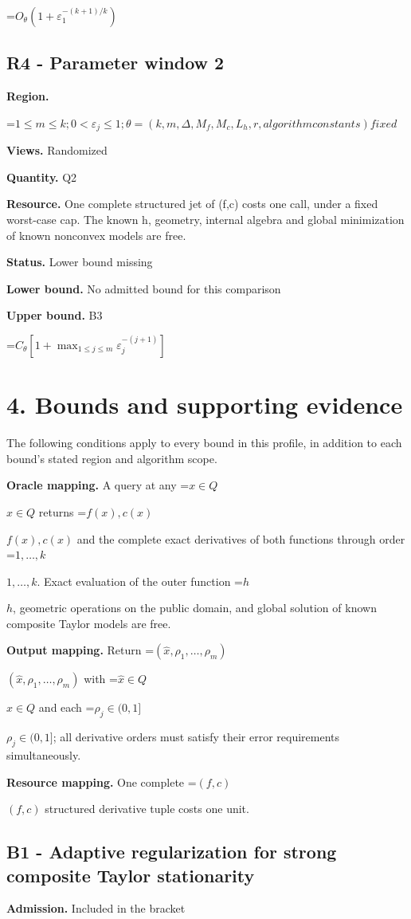 \documentclass[10pt,a4paper]{article}
\newcommand{\AtlasMath}[1]{\par\begingroup\centering\setbox0=\hbox{$\displaystyle #1$}\ifdim\wd0>1.4\linewidth\typeout{ATLAS WIDE FORMULA: \the\wd0}\fi\ifdim\wd0>\linewidth\resizebox{\linewidth}{!}{\box0}\else\box0\fi\par\endgroup}
\newcommand{\AtlasInlineMath}[1]{\begingroup\setbox0=\hbox{$#1$}\ifdim\wd0>.4\linewidth\endgroup\AtlasMath{#1}\else\endgroup$#1$\fi}
\begin{document}
\AtlasMath{O_\theta(1+\varepsilon_1^{-(k+1)/k})}
\subsection{R4 - Parameter window 2}
\textbf{Region.} 
\AtlasMath{1\le m\le k;0<\varepsilon_j\le 1;\theta=(k,m,\Delta,M_f,M_c,L_h,r,algorithm constants) fixed}


\textbf{Views.} Randomized

\textbf{Quantity.} Q2

\textbf{Resource.} One complete structured jet of (f,c) costs one call, under a fixed worst-case cap. The known h, geometry, internal algebra and global minimization of known nonconvex models are free.

\textbf{Status.} Lower bound missing

\textbf{Lower bound.} No admitted bound for this comparison

\textbf{Upper bound.} B3

\AtlasMath{C_\theta[1+\max_{1\le j\le m}\varepsilon_j^{-(j+1)}]}
\section{4. Bounds and supporting evidence}
The following conditions apply to every bound in this profile, in addition to each bound's stated region and algorithm scope.

\textbf{Oracle mapping.} A query at any \AtlasInlineMath{x\in Q} returns \AtlasInlineMath{f(x),c(x)} and the complete exact derivatives of both functions through order \AtlasInlineMath{1,\ldots,k}. Exact evaluation of the outer function \AtlasInlineMath{h}, geometric operations on the public domain, and global solution of known composite Taylor models are free.

\textbf{Output mapping.} Return \AtlasInlineMath{(\widehat{x},\rho_1,\ldots,\rho_m)} with \AtlasInlineMath{\widehat{x}\in Q} and each \AtlasInlineMath{\rho_j\in(0,1]}; all derivative orders must satisfy their error requirements simultaneously.

\textbf{Resource mapping.} One complete \AtlasInlineMath{(f,c)} structured derivative tuple costs one unit.

\subsection{B1 - Adaptive regularization for strong composite Taylor stationarity}
\textbf{Admission.} Included in the bracket
\end{document}
